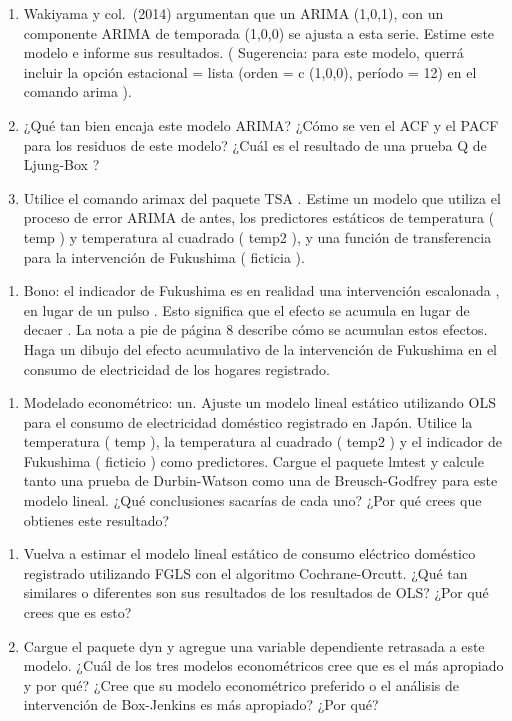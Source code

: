 \documentclass[
]{book}
\providecommand{\tightlist}{%
  \setlength{\itemsep}{0pt}\setlength{\parskip}{0pt}}
\begin{document}
\begin{enumerate}
\def\labelenumi{\Alph{enumi}.}
\setcounter{enumi}{1}
\item
  Wakiyama y col.~(2014) argumentan que un ARIMA (1,0,1), con un componente ARIMA de temporada (1,0,0) se ajusta a esta serie. Estime este modelo e informe sus resultados. ( Sugerencia: para este modelo, querrá incluir la opción estacional = lista (orden = c (1,0,0), período = 12) en el comando arima ).
\item
  ¿Qué tan bien encaja este modelo ARIMA? ¿Cómo se ven el ACF y el PACF para los residuos de este modelo? ¿Cuál es el resultado de una prueba Q de Ljung-Box ?
\item
  Utilice el comando arimax del paquete TSA . Estime un modelo que utiliza el proceso de error ARIMA de antes, los predictores estáticos de temperatura ( temp ) y temperatura al cuadrado ( temp2 ), y una función de transferencia para la intervención de Fukushima ( ficticia ).
\end{enumerate}

\begin{enumerate}
\def\labelenumi{\roman{enumi}.}
\setcounter{enumi}{1000}
\tightlist
\item
  Bono: el indicador de Fukushima es en realidad una intervención escalonada , en lugar de un pulso . Esto significa que el efecto se acumula en lugar de decaer . La nota a pie de página 8 describe cómo se acumulan estos efectos. Haga un dibujo del efecto acumulativo de la intervención de Fukushima en el consumo de electricidad de los hogares registrado.
\end{enumerate}

\begin{enumerate}
\def\labelenumi{\arabic{enumi}.}
\setcounter{enumi}{2}
\tightlist
\item
  Modelado econométrico:
  un.
  Ajuste un modelo lineal estático utilizando OLS para el consumo de electricidad doméstico registrado en Japón. Utilice la temperatura ( temp ), la temperatura al cuadrado ( temp2 ) y el indicador de Fukushima ( ficticio ) como predictores. Cargue el paquete lmtest y calcule tanto una prueba de Durbin-Watson como una de Breusch-Godfrey para este modelo lineal. ¿Qué conclusiones sacarías de cada uno? ¿Por qué crees que obtienes este resultado?
\end{enumerate}

\begin{enumerate}
\def\labelenumi{\Alph{enumi}.}
\setcounter{enumi}{1}
\item
  Vuelva a estimar el modelo lineal estático de consumo eléctrico doméstico registrado utilizando FGLS con el algoritmo Cochrane-Orcutt. ¿Qué tan similares o diferentes son sus resultados de los resultados de OLS? ¿Por qué crees que es esto?
\item
  Cargue el paquete dyn y agregue una variable dependiente retrasada a este modelo. ¿Cuál de los tres modelos econométricos cree que es el más apropiado y por qué? ¿Cree que su modelo econométrico preferido o el análisis de intervención de Box-Jenkins es más apropiado? ¿Por qué?
\end{enumerate}
\end{document}
